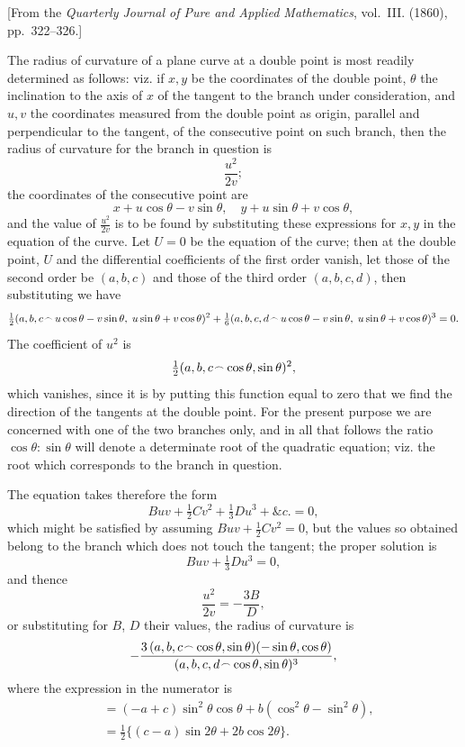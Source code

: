 \documentclass[11pt,a4paper]{book}
\begin{document}
[From the \textit{Quarterly Journal of Pure and Applied Mathematics}, vol.~III. (1860), pp.~322--326.]

The radius of curvature of a plane curve at a double point is most readily determined as follows: viz. if $x, y$ be the coordinates of the double point, $\theta$ the inclination to the axis of $x$ of the tangent to the branch under consideration, and $u, v$ the coordinates measured from the double point as origin, parallel and perpendicular to the tangent, of the consecutive point on such branch, then the radius of curvature for the branch in question is
\[
\frac{u^2}{2v};
\]
the coordinates of the consecutive point are
\[
x + u\cos\theta - v\sin\theta,\quad y + u\sin\theta + v\cos\theta,
\]
and the value of $\frac{u^2}{2v}$ is to be found by substituting these expressions for $x, y$ in the equation of the curve. Let $U = 0$ be the equation of the curve; then at the double point, $U$ and the differential coefficients of the first order vanish, let those of the second order be $(a, b, c)$ and those of the third order $(a, b, c, d)$, then substituting we have
\[
\tfrac{1}{2}(a, b, c \mathbin{\vcenter{\hbox{$\scriptstyle\!\frown$}}} u\cos\theta - v\sin\theta,\; u\sin\theta + v\cos\theta)^2 + \tfrac{1}{6}(a, b, c, d \mathbin{\vcenter{\hbox{$\scriptstyle\!\frown$}}} u\cos\theta - v\sin\theta,\; u\sin\theta + v\cos\theta)^3 = 0.
\]
The coefficient of $u^2$ is
\[
\tfrac{1}{2}(a, b, c \mathbin{\vcenter{\hbox{$\scriptstyle\!\frown$}}} \cos\theta, \sin\theta)^2,
\]
which vanishes, since it is by putting this function equal to zero that we find the direction of the tangents at the double point. For the present purpose we are concerned with one of the two branches only, and in all that follows the ratio $\cos\theta : \sin\theta$ will denote a determinate root of the quadratic equation; viz. the root which corresponds to the branch in question.

The equation takes therefore the form
\[
Buv + \tfrac{1}{2}Cv^2 + \tfrac{1}{3}Du^3 + \&c. = 0,
\]
which might be satisfied by assuming $Buv + \tfrac{1}{2}Cv^2 = 0$, but the values so obtained belong to the branch which does not touch the tangent; the proper solution is
\[
Buv + \tfrac{1}{3}Du^3 = 0,
\]
and thence
\[
\frac{u^2}{2v} = -\frac{3B}{D},
\]
or substituting for $B$, $D$ their values, the radius of curvature is
\[
-\frac{3\,(a, b, c \mathbin{\vcenter{\hbox{$\scriptstyle\!\frown$}}} \cos\theta, \sin\theta)(-\sin\theta, \cos\theta)}{(a, b, c, d \mathbin{\vcenter{\hbox{$\scriptstyle\!\frown$}}} \cos\theta, \sin\theta)^3},
\]
where the expression in the numerator is
\begin{align*}
&= (-a + c)\sin^2\theta\cos\theta + b(\cos^2\theta - \sin^2\theta),\\
&= \tfrac{1}{2}\{(c - a)\sin 2\theta + 2b\cos 2\theta\}.
\end{align*}
\end{document}
